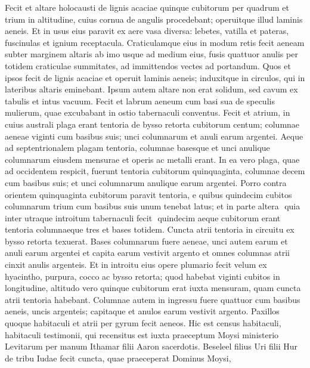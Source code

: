 \begin{biblechapter}  
\verse Fecit et altare holocausti de lignis acaciae quinque cubitorum per quadrum et trium in altitudine, 
\verse cuius cornua de angulis procedebant; operuitque illud laminis aeneis. 
\verse Et in usus eius paravit ex aere vasa diversa: lebetes, vatilla et pateras, fuscinulas et ignium receptacula. 
\verse Craticulamque eius in modum retis fecit aeneam subter marginem altaris ab imo usque ad medium eius, 
\verse fusis quattuor anulis per totidem craticulae summitates, ad immittendos vectes ad portandum. 
\verse Quos et ipsos fecit de lignis acaciae et operuit laminis aeneis; 
\verse induxitque in circulos, qui in lateribus altaris eminebant. Ipsum autem altare non erat solidum, sed cavum ex tabulis et intus vacuum. 
\verse Fecit et labrum aeneum cum basi sua de speculis mulierum, quae excubabant in ostio tabernaculi conventus. 
\verse Fecit et atrium, in cuius australi plaga erant tentoria de bysso retorta cubitorum centum; 
\verse columnae aeneae viginti cum basibus suis; unci columnarum et anuli earum argentei. 
\verse Aeque ad septentrionalem plagam tentoria, columnae basesque et unci anulique columnarum eiusdem mensurae et operis ac metalli erant. 
\verse In ea vero plaga, quae ad occidentem respicit, fuerunt tentoria cubitorum quinquaginta, columnae decem cum basibus suis; et unci columnarum anulique earum argentei. 
\verse Porro contra orientem quinquaginta cubitorum paravit tentoria, 
\verse e quibus quindecim cubitos columnarum trium cum basibus suis unum tenebat latus; 
\verse et in parte altera ­ quia inter utraque introitum tabernaculi fecit ­ quindecim aeque cubitorum erant tentoria columnaeque tres et bases totidem. 
\verse Cuncta atrii tentoria in circuitu ex bysso retorta texuerat. 
\verse Bases columnarum fuere aeneae, unci autem earum et anuli earum argentei et capita earum vestivit argento et omnes columnas atrii cinxit anulis argenteis. 
\verse Et in introitu eius opere plumario fecit velum ex hyacintho, purpura, cocco ac bysso retorta; quod habebat viginti cubitos in longitudine, altitudo vero quinque cubitorum erat iuxta mensuram, quam cuncta atrii tentoria habebant.  
\verse Columnae autem in ingressu fuere quattuor cum basibus aeneis, uncis argenteis; capitaque et anulos earum vestivit argento. 
\verse Paxillos quoque habitaculi et atrii per gyrum fecit aeneos. 
\verse Hic est census habitaculi, habitaculi testimonii, qui recensitus est iuxta praeceptum Moysi ministerio Levitarum per manum Ithamar filii Aaron sacerdotis. 
\verse Beseleel filius Uri filii Hur de tribu Iudae fecit cuncta, quae praeceperat Dominus Moysi, 

\end{biblechapter}
